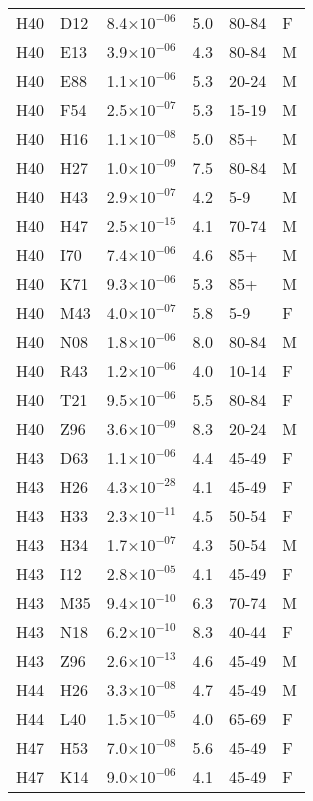 \begin{longtable}{lllrll}
   H40 & D12 & 8.4$\times10^{-06}$ & 5.0 & 80-84 & F \\ 
   H40 & E13 & 3.9$\times10^{-06}$ & 4.3 & 80-84 & M \\ 
   H40 & E88 & 1.1$\times10^{-06}$ & 5.3 & 20-24 & M \\ 
   H40 & F54 & 2.5$\times10^{-07}$ & 5.3 & 15-19 & M \\ 
   H40 & H16 & 1.1$\times10^{-08}$ & 5.0 & 85+ & M \\ 
   H40 & H27 & 1.0$\times10^{-09}$ & 7.5 & 80-84 & M \\ 
   H40 & H43 & 2.9$\times10^{-07}$ & 4.2 & 5-9 & M \\ 
   H40 & H47 & 2.5$\times10^{-15}$ & 4.1 & 70-74 & M \\ 
   H40 & I70 & 7.4$\times10^{-06}$ & 4.6 & 85+ & M \\ 
   H40 & K71 & 9.3$\times10^{-06}$ & 5.3 & 85+ & M \\ 
   H40 & M43 & 4.0$\times10^{-07}$ & 5.8 & 5-9 & F \\ 
   H40 & N08 & 1.8$\times10^{-06}$ & 8.0 & 80-84 & M \\ 
   H40 & R43 & 1.2$\times10^{-06}$ & 4.0 & 10-14 & F \\ 
   H40 & T21 & 9.5$\times10^{-06}$ & 5.5 & 80-84 & F \\ 
   H40 & Z96 & 3.6$\times10^{-09}$ & 8.3 & 20-24 & M \\ 
   H43 & D63 & 1.1$\times10^{-06}$ & 4.4 & 45-49 & F \\ 
   H43 & H26 & 4.3$\times10^{-28}$ & 4.1 & 45-49 & F \\ 
   H43 & H33 & 2.3$\times10^{-11}$ & 4.5 & 50-54 & F \\ 
   H43 & H34 & 1.7$\times10^{-07}$ & 4.3 & 50-54 & M \\ 
   H43 & I12 & 2.8$\times10^{-05}$ & 4.1 & 45-49 & F \\ 
   H43 & M35 & 9.4$\times10^{-10}$ & 6.3 & 70-74 & M \\ 
   H43 & N18 & 6.2$\times10^{-10}$ & 8.3 & 40-44 & F \\ 
   H43 & Z96 & 2.6$\times10^{-13}$ & 4.6 & 45-49 & M \\ 
   H44 & H26 & 3.3$\times10^{-08}$ & 4.7 & 45-49 & M \\ 
   H44 & L40 & 1.5$\times10^{-05}$ & 4.0 & 65-69 & F \\ 
   H47 & H53 & 7.0$\times10^{-08}$ & 5.6 & 45-49 & F \\ 
   H47 & K14 & 9.0$\times10^{-06}$ & 4.1 & 45-49 & F \\ 

\end{longtable}
